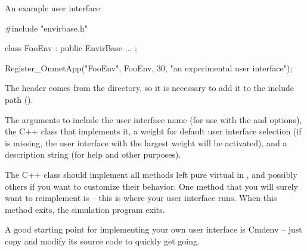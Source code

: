 An example user interface:

\begin{cpp}
#include "envirbase.h"

class FooEnv : public EnvirBase
{
    ...
};

Register_OmnetApp("FooEnv", FooEnv, 30, "an experimental user interface");
\end{cpp}

The  header comes from the  directory,
so it is necessary to add it to the include path ().

The arguments to  include the user interface name
(for use with the  and  options),
the C++ class that implements it, a weight for default user interface selection
(if  is missing, the user interface with the largest weight will be
activated), and a description string (for help and other purposes).

The C++ class should implement all methods left pure virtual in
, and possibly others if you want to customize
their behavior. One method that you will surely want to reimplement is
 -- this is where your user interface runs. When this method
exits, the simulation program exits.

\begin{note}
A good starting point for implementing your own user interface is
Cmdenv -- just copy and modify its source code to quickly get going.
\end{note}


